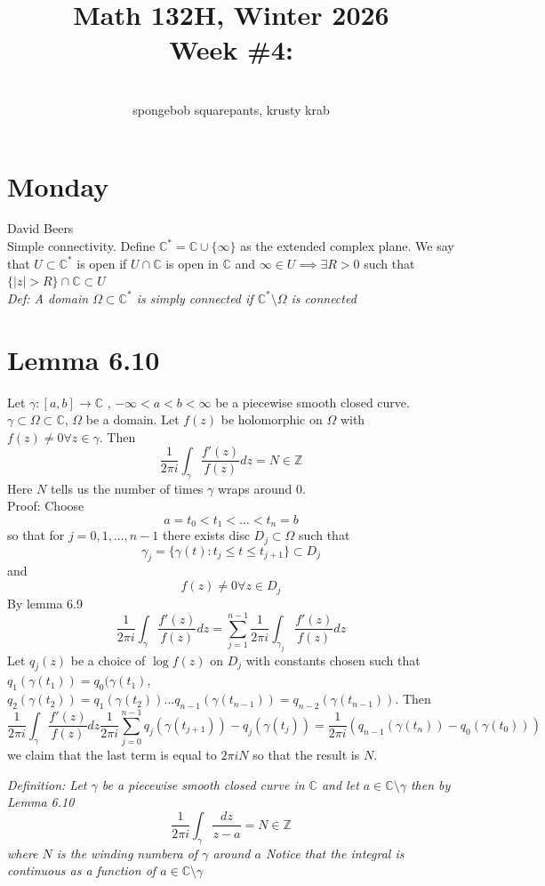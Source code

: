 \documentclass[11pt]{article}
\newcommand{\cnum}{Math 132H}
\newcommand{\ced}{Winter 2026}
\newcommand{\ctitle}[4]{\title{\vspace{-0.5in}\cnum, \ced\\Week #1: #2}\author{\vspace{-0.35in}\\#3, #4}}
\begin{document}
\ctitle{\#4}{}{spongebob squarepants}{krusty krab}
\date{}
\maketitle

\section{Monday}
David Beers\\
Simple connectivity. Define $ \mathbb{C}^{*} = \mathbb{C} \cup \{\infty\}$ as the extended complex plane.
We say that $U \subset \mathbb{C}^{*}$ is open if $U \cap \mathbb{C}$ is open in $ \mathbb{C}$ and
$\infty \in U \implies \exists R > 0$ such that $\{|z| > R\} \cap \mathbb{C} \subset U$\\
\emph{
    Def: A domain $\Omega \subset \mathbb{C}^{*}$ is simply connected if $ \mathbb{C}^{*} \setminus \Omega$ is connected
}

\section{Lemma 6.10}
Let $\gamma : [a,b] \rightarrow \mathbb{C}$ , $-\infty < a < b < \infty$ be a piecewise smooth closed curve.
$\gamma \subset \Omega \subset \mathbb{C}$, $\Omega$ be a domain. Let $f(z)$ be holomorphic on $\Omega$
with $f(z) \ne 0 \forall z \in \gamma$. Then
 \[
\frac{1}{2\pi i} \int_{\gamma}^{} \frac{f'(z)}{f(z)}dz = N \in \mathbb{Z}
\] 
Here $N$ tells us the number of times  $\gamma$ wraps around 0.\\
Proof: Choose 
 \[
a = t_0 < t_1 < \dots < t_n = b
\] 
so that for $j = 0,1,\dots,n-1$ there exists disc $D_j \subset \Omega$ such that
\[
    \gamma_j = \{\gamma(t) : t_j \le t \le t_{j+1}\} \subset D_j
\] 
and
\[
f(z) \ne 0 \forall z \in D_j
\] 
By lemma 6.9
\[
\frac{1}{2\pi i} \int_{ \gamma}^{}\frac{f'(z)}{f(z)} dz = \sum_{j=1}^{n-1}\frac{1}{2\pi i} \int_{ \gamma_j}^{} \frac{f'(z)}{f(z)}dz
\] 
Let $q_j(z)$ be a choice of  $\log f(z)$ on  $D_j$ with constants chosen such that  $q_1(\gamma(t_1)) = q_0(\gamma(t_1)$, $q_2(\gamma(t_2)) = q_1(\gamma(t_2)) \dots q_{n-1}(\gamma(t_{n-1})) = q_{n-2}(\gamma(t_{n-1}))$.
Then
\[
    \frac{1}{2\pi i} \int_{ \gamma}^{} \frac{f'(z)}{f(z)}dz  \frac{1}{2\pi i} \sum_{j=0}^{n-1} q_j(\gamma(t_{j+1})) - q_j(\gamma(t_j)) = \frac{1}{2\pi i}(q_{n-1}(\gamma(t_n)) - q_0(\gamma(t_0)))
\] 
we claim that the last term is equal to $2\pi i N$ so that the result is $N$.

\emph{
    Definition: Let $\gamma$ be a piecewise smooth closed curve in $ \mathbb{C}$ and let $a \in \mathbb{C} \setminus \gamma
        $ then by Lemma 6.10
    \[
        \frac{1}{2\pi i} \int_{ \gamma}^{}\frac{dz}{z-a} =  N \in \mathbb{Z}
    \] 
    where $N$ is the winding numbera of $\gamma$ around $a$ Notice that the integral is continuous as a function of  $a \in \mathbb{C} \setminus \gamma$
}
\end{document}
